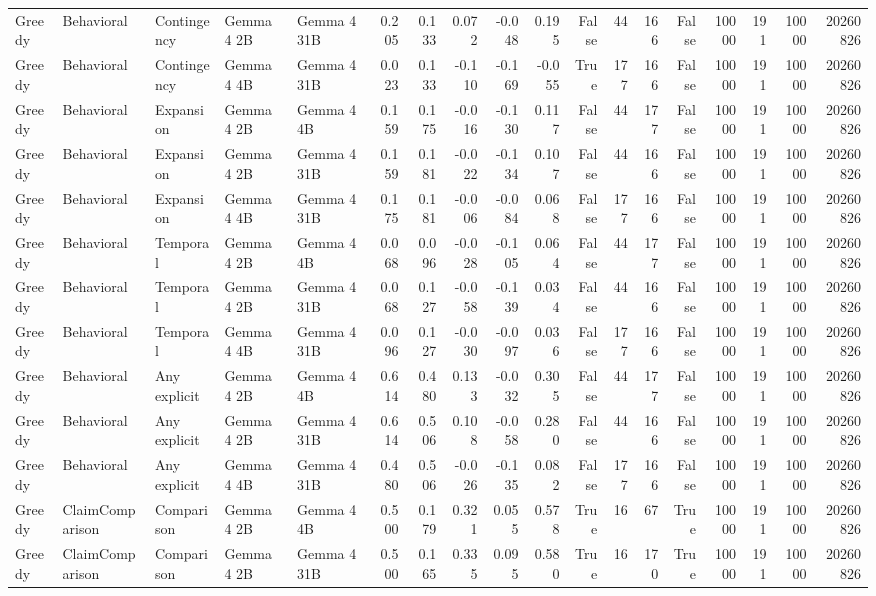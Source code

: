 \begin{tabular}{lllllrrrrrrrrrrrrr}
Greedy & Behavioral & Contingency & Gemma 4 2B & Gemma 4 31B & 0.205 & 0.133 & 0.072 & -0.048 & 0.195 & False & 44 & 166 & False & 10000 & 191 & 10000 & 20260826 \\
Greedy & Behavioral & Contingency & Gemma 4 4B & Gemma 4 31B & 0.023 & 0.133 & -0.110 & -0.169 & -0.055 & True & 177 & 166 & False & 10000 & 191 & 10000 & 20260826 \\
Greedy & Behavioral & Expansion & Gemma 4 2B & Gemma 4 4B & 0.159 & 0.175 & -0.016 & -0.130 & 0.117 & False & 44 & 177 & False & 10000 & 191 & 10000 & 20260826 \\
Greedy & Behavioral & Expansion & Gemma 4 2B & Gemma 4 31B & 0.159 & 0.181 & -0.022 & -0.134 & 0.107 & False & 44 & 166 & False & 10000 & 191 & 10000 & 20260826 \\
Greedy & Behavioral & Expansion & Gemma 4 4B & Gemma 4 31B & 0.175 & 0.181 & -0.006 & -0.084 & 0.068 & False & 177 & 166 & False & 10000 & 191 & 10000 & 20260826 \\
Greedy & Behavioral & Temporal & Gemma 4 2B & Gemma 4 4B & 0.068 & 0.096 & -0.028 & -0.105 & 0.064 & False & 44 & 177 & False & 10000 & 191 & 10000 & 20260826 \\
Greedy & Behavioral & Temporal & Gemma 4 2B & Gemma 4 31B & 0.068 & 0.127 & -0.058 & -0.139 & 0.034 & False & 44 & 166 & False & 10000 & 191 & 10000 & 20260826 \\
Greedy & Behavioral & Temporal & Gemma 4 4B & Gemma 4 31B & 0.096 & 0.127 & -0.030 & -0.097 & 0.036 & False & 177 & 166 & False & 10000 & 191 & 10000 & 20260826 \\
Greedy & Behavioral & Any explicit & Gemma 4 2B & Gemma 4 4B & 0.614 & 0.480 & 0.133 & -0.032 & 0.305 & False & 44 & 177 & False & 10000 & 191 & 10000 & 20260826 \\
Greedy & Behavioral & Any explicit & Gemma 4 2B & Gemma 4 31B & 0.614 & 0.506 & 0.108 & -0.058 & 0.280 & False & 44 & 166 & False & 10000 & 191 & 10000 & 20260826 \\
Greedy & Behavioral & Any explicit & Gemma 4 4B & Gemma 4 31B & 0.480 & 0.506 & -0.026 & -0.135 & 0.082 & False & 177 & 166 & False & 10000 & 191 & 10000 & 20260826 \\
Greedy & ClaimComparison & Comparison & Gemma 4 2B & Gemma 4 4B & 0.500 & 0.179 & 0.321 & 0.055 & 0.578 & True & 16 & 67 & True & 10000 & 191 & 10000 & 20260826 \\
Greedy & ClaimComparison & Comparison & Gemma 4 2B & Gemma 4 31B & 0.500 & 0.165 & 0.335 & 0.095 & 0.580 & True & 16 & 170 & True & 10000 & 191 & 10000 & 20260826 \\

\end{tabular}

